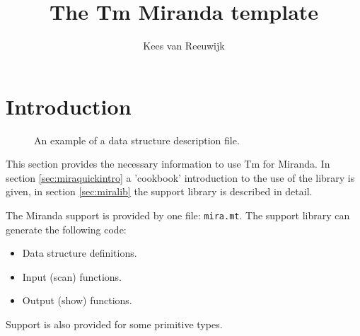 \documentclass{article}
\def\Tm{{\sf Tm}}
\def\Miranda{Miranda}
\begin{document}
\title{The Tm Miranda template}
\author{Kees van Reeuwijk}
\maketitle
\section{Introduction}
\begin{figure}[h]

\caption{\label{f.ds}An example of a data structure description file.}
\end{figure}
This section provides the necessary information to use {\Tm} for {\Miranda}.
In section \ref{sec:miraquickintro} a 'cookbook' introduction to the use
of the library is given, in section \ref{sec:miralib} the support
library is described in detail.
\par
The {\Miranda} support is provided by one file: {\tt mira.mt}.
The support library can generate the following code:
\begin{itemize}
\item
Data structure definitions.
\item
Input (scan) functions.
\item
Output (show) functions.
\end{itemize}
\par
Support is also provided for some primitive types.
\end{document}

